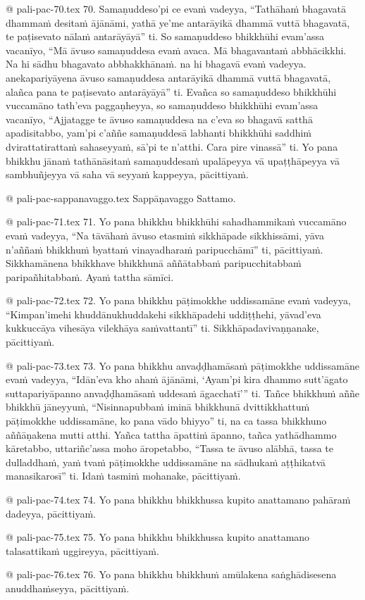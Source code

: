 @ pali-pac-70.tex
70. Samaṇuddeso’pi ce evaṁ vadeyya, “Tathāhaṁ bhagavatā dhammaṁ desitaṁ ājānāmi, yathā ye’me antarāyikā dhammā vuttā bhagavatā, te paṭisevato nālaṁ antarāyāyā” ti. So samaṇuddeso bhikkhūhi evam’assa vacanīyo, “Mā āvuso samaṇuddesa evaṁ avaca. Mā bhagavantaṁ abbhācikkhi. Na hi sādhu bhagavato abbhakkhānaṁ. na hi bhagavā evaṁ vadeyya. anekapariyāyena āvuso samaṇuddesa antarāyikā dhammā vuttā bhagavatā, alañca pana te paṭisevato antarāyāyā” ti. Evañca so samaṇuddeso bhikkhūhi vuccamāno tath’eva paggaṇheyya, so samaṇuddeso bhikkhūhi evam’assa vacanīyo, “Ajjatagge te āvuso samaṇuddesa na c’eva so bhagavā satthā apadisitabbo, yam’pi c’aññe samaṇuddesā labhanti bhikkhūhi saddhiṁ dvirattatirattaṁ sahaseyyaṁ, sā’pi te n’atthi. Cara pire vinassā” ti. Yo pana bhikkhu jānaṁ tathānāsitaṁ samaṇuddesaṁ upalāpeyya vā upaṭṭhāpeyya vā sambhuñjeyya vā saha vā seyyaṁ kappeyya, pācittiyaṁ.

@ pali-pac-sappanavaggo.tex
Sappāṇavaggo Sattamo.

@ pali-pac-71.tex
71. Yo pana bhikkhu bhikkhūhi sahadhammikaṁ vuccamāno evaṁ vadeyya, “Na tāvāhaṁ āvuso etasmiṁ sikkhāpade sikkhissāmi, yāva n’aññaṁ bhikkhuṁ byattaṁ vinayadharaṁ paripucchāmī” ti, pācittiyaṁ. Sikkhamānena bhikkhave bhikkhunā aññātabbaṁ paripucchitabbaṁ paripañhitabbaṁ. Ayaṁ tattha sāmīci.

@ pali-pac-72.tex
72. Yo pana bhikkhu pāṭimokkhe uddissamāne evaṁ vadeyya, “Kimpan’imehi khuddānukhuddakehi sikkhāpadehi uddiṭṭhehi, yāvad’eva kukkuccāya vihesāya vilekhāya saṁvattantī” ti. Sikkhāpadavivaṇṇanake, pācittiyaṁ.

@ pali-pac-73.tex
73. Yo pana bhikkhu anvaḍḍhamāsaṁ pāṭimokkhe uddissamāne evaṁ vadeyya, “Idān’eva kho ahaṁ ājānāmi, ‘Ayam’pi kira dhammo sutt’āgato suttapariyāpanno anvaḍḍhamāsaṁ uddesaṁ āgacchatī’” ti. Tañce bhikkhuṁ aññe bhikkhū jāneyyuṁ, “Nisinnapubbaṁ iminā bhikkhunā dvittikkhattuṁ pāṭimokkhe uddissamāne, ko pana vādo bhiyyo” ti, na ca tassa bhikkhuno aññāṇakena mutti atthi. Yañca tattha āpattiṁ āpanno, tañca yathādhammo kāretabbo, uttariñc’assa moho āropetabbo, “Tassa te āvuso alābhā, tassa te dulladdhaṁ, yaṁ tvaṁ pāṭimokkhe uddissamāne na sādhukaṁ aṭṭhikatvā manasikarosī” ti. Idaṁ tasmiṁ mohanake, pācittiyaṁ.

@ pali-pac-74.tex
74. Yo pana bhikkhu bhikkhussa kupito anattamano pahāraṁ dadeyya, pācittiyaṁ.

@ pali-pac-75.tex
75. Yo pana bhikkhu bhikkhussa kupito anattamano talasattikaṁ uggireyya, pācittiyaṁ.

@ pali-pac-76.tex
76. Yo pana bhikkhu bhikkhuṁ amūlakena saṅghādisesena anuddhaṁseyya, pācittiyaṁ.


